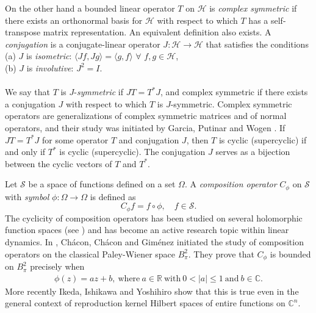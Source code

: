 \documentclass[11pt]{amsart}%
\numberwithin{equation}{section}
\theoremstyle{plain}
\theoremstyle{definition}
\theoremstyle{definition}
\begin{document}
On the other hand a bounded linear operator $T$ on $\mathcal{H}$ is \emph{complex symmetric} if there exists an orthonormal basis for $\mathcal{H}$ with respect to which $T$ has a self-transpose matrix representation. An equivalent definition also exists. A \emph{conjugation} is a conjugate-linear operator $J:\mathcal{H}\to\mathcal{H}$ that satisfies the conditions \\

(a) $J$ is \emph{isometric}: $\langle Jf, Jg \rangle=\langle g,f \rangle$ $\forall$ $f,g\in\mathcal{H}$,\\

(b) $J$ is \emph{involutive}: $J^2=I$.\\ \\
We say that $T$ is $J$-\emph{symmetric} if $JT=T^*J$, and complex symmetric if there exists a conjugation $J$ with respect to which $T$ is $J$-symmetric. Complex symmetric operators are generalizations of complex symmetric matrices and of normal operators, and their study was initiated by Garcia, Putinar and Wogen \cite{Garcia 1, Garcia 2, Garcia 3, Garcia 4}.  If $JT=T^*J$ for some operator $T$ and conjugation $J$, then $T$ is cyclic (supercyclic) if and only if $T^*$ is cyclic (supercyclic). The conjugation $J$ serves as a bijection between the cyclic vectors of $T$ and $T^*$.



Let $\mathcal{S}$ be a  space of functions defined on a set $\Omega.$ 
A \emph{composition operator} $C_{\phi}$
on $\mathcal{S}$ with \emph{symbol} $\phi:\Omega\to\Omega$  is defined as
\[
C_{\phi}f=f\circ \phi, \quad f\in \mathcal{S}.
\]
The cyclicity of composition operators has been studied on several holomorphic function spaces (see \cite{Bayart, Gallardo, Noor}) and has become an active research topic within linear dynamics. In \cite{chacon2007composition}, Chácon, Chácon and Giménez initiated the study of composition operators on the classical Paley-Wiener space $B^2_{\pi}.$ They prove that $C_\phi$ is bounded on $B^2_{\pi}$ precisely when
\begin{align}\label{b1}
\phi(z)=az+b,\ \text{where} \ a\in \mathbb{R} \ \text{with} \ 0<|a|\leq 1 \ \text{and} \ b\in \mathbb{C}.
\end{align}
More recently Ikeda, Ishikawa and Yoshihiro \cite{Ikeda} show that this is true even in the general context of reproduction kernel Hilbert spaces of entire functions on $\mathbb{C}^n$. 
\end{document}
